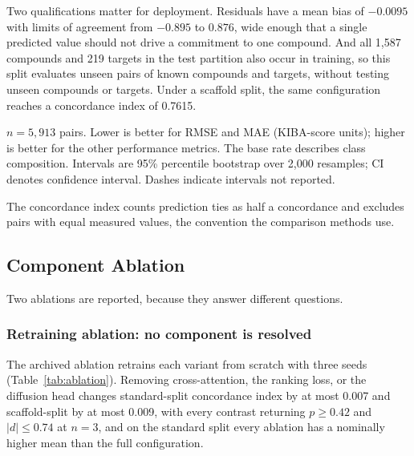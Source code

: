 \documentclass{ieeeaccess}
\begin{document}
Two qualifications matter for deployment. Residuals have a mean bias of
$-0.0095$ with limits of agreement from $-0.895$ to $0.876$, wide enough that a
single predicted value should not drive a commitment to one compound. And all
1{,}587 compounds and 219 targets in the test partition also occur in training,
so this split evaluates unseen pairs of known compounds and targets, without
testing unseen compounds or targets. Under a scaffold split, the same
configuration reaches a concordance index of 0.7615.

\begin{table}[!t]
\caption{Predictive accuracy on the KIBA standard-split test partition.}
\label{tab:metrics}
\centering
\begin{threeparttable}
%
{}%
{}
\begin{tablenotes}[flushleft]\footnotesize\raggedright
\item $n = 5{,}913$ pairs. Lower is better for RMSE and MAE (KIBA-score units);
higher is better for the other performance metrics. The base rate describes
class composition. Intervals are 95\% percentile bootstrap over 2{,}000 resamples;
CI denotes confidence interval. Dashes indicate intervals not reported.
\item The concordance index counts prediction ties as half a concordance and
excludes pairs with equal measured values, the convention the comparison
methods use.
\end{tablenotes}
\end{threeparttable}
\end{table}

\subsection{Component Ablation}
\label{sec:ablation}
Two ablations are reported, because they answer different questions.

\subsubsection{Retraining ablation: no component is resolved}
The archived ablation retrains each variant from scratch with three seeds
(Table~\ref{tab:ablation}). Removing cross-attention, the ranking loss, or the
diffusion head changes standard-split concordance index by at most 0.007 and
scaffold-split by at most 0.009, with every contrast returning $p \geq 0.42$ and
$|d| \leq 0.74$ at $n = 3$, and on the standard split every ablation has a
nominally higher mean than the full configuration.
\end{document}
